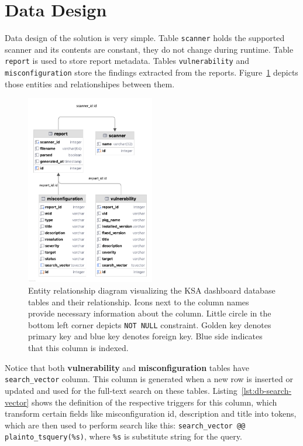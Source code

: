 \section{Data Design}
\label{sec:data-design}

Data design of the solution is very simple. Table \lstinline{scanner} holds the supported scanner and its contents are constant, they do not change during runtime. Table \lstinline{report} is used to store report metadata. Tables \lstinline{vulnerability} and \lstinline{misconfiguration} store the findings extracted from the reports. Figure~\ref{img:er-diagram} depicts those entities and relationshipes between them.

\begin{figure}[!hbt]
	\begin{center}
		\includegraphics[width=0.5\textwidth]{images/er-diagram.png}
        \caption[Entity relationship diagram visualizing the KSA dashboard database tables and their relationship.]{Entity relationship diagram visualizing the KSA dashboard database tables and their relationship. Icons next to the column names provide necessary information about the column. Little circle in the bottom left corner depicts \lstinline{NOT NULL} constraint. Golden key denotes primary key and blue key denotes foreign key. Blue side indicates that this column is indexed.}
		\label{img:er-diagram}
	\end{center}
\end{figure}

Notice that both \textbf{vulnerability} and \textbf{misconfiguration} tables have \lstinline{search_vector} column. This column is generated when a new row is inserted or updated and used for the full-text search on these tables. Listing~\ref{lst:db-search-vector} shows the definition of the respective triggers for this column, which transform certain fields like misconfiguration id, description and title into tokens, which are then used to perform search like this: \lstinline{search_vector @@ plainto_tsquery(%s)}, where \lstinline{%s} is substitute string for the query.

